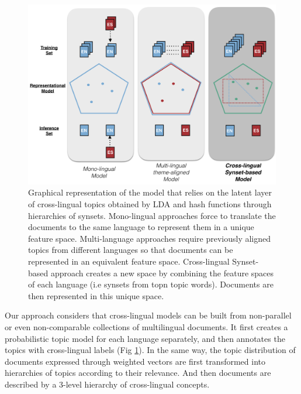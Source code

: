 \begin{figure}\centering
\includegraphics[scale=0.4]{latent-topic-models.png}
\caption{Graphical representation of the model that relies on the latent layer of cross-lingual topics obtained by LDA and hash functions through hierarchies of synsets. Mono-lingual approaches force to translate the documents to the same language to represent them in a unique feature space. Multi-language approaches require previously aligned topics from different languages so that documents can be represented in an equivalent feature space. Cross-lingual Synset-based approach creates a new space by combining the feature spaces of each language (i.e synsets from topn topic words). Documents are then represented in this unique space.}
\label{fig:hash_functions}
\end{figure}

Our approach considers that cross-lingual models can be built from non-parallel or even non-comparable collections of multilingual documents. It first creates a probabilistic topic model for each language separately, and then annotates the topics with cross-lingual labels (Fig \ref{fig:hash_functions}). In the same way, the topic distribution of documents expressed through weighted vectors are first transformed into hierarchies of topics according to their relevance. And then documents are described by a 3-level hierarchy of cross-lingual concepts.

